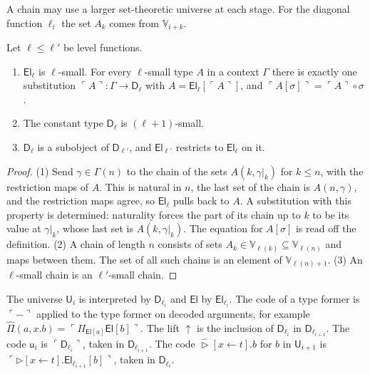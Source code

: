 \documentclass[acmsmall,nonacm,screen]{acmart}
\newcommand{\later}{{\triangleright}}
\newcommand{\laterc}{\widehat{\triangleright}}
\newcommand{\Uv}{\mathsf{U}}
\newcommand{\El}{\mathsf{El}}
\newcommand{\Vg}{\mathbb{V}}
\newcommand{\Dg}{\mathsf{D}}
\newcommand{\dsub}[2]{[#1 \leftarrow #2]}
\newcommand{\rest}[2]{#1|_{#2}}
\begin{document}
A chain may use a larger set-theoretic universe at each stage. For the diagonal function
$\ell_i$ the set $A_k$ comes from $\Vg_{i+k}$.

\begin{lemma}\label{lem:classify}
Let $\ell \le \ell'$ be level functions.
\begin{enumerate}
\item $\El_\ell$ is $\ell$-small. For every $\ell$-small type $A$ in a context $\Gamma$ there
  is exactly one substitution $\ulcorner A \urcorner : \Gamma \to \Dg_\ell$ with
  $A = \El_\ell[\ulcorner A \urcorner]$, and
  $\ulcorner A[\sigma] \urcorner = \ulcorner A \urcorner \circ \sigma$.
\item The constant type $\Dg_\ell$ is $(\ell+1)$-small.
\item $\Dg_\ell$ is a subobject of $\Dg_{\ell'}$, and $\El_{\ell'}$ restricts to $\El_\ell$ on
  it.
\end{enumerate}
\end{lemma}

\begin{proof}
(1) Send $\gamma \in \Gamma(n)$ to the chain of the sets $A(k,\rest{\gamma}{k})$ for
$k \le n$, with the restriction maps of $A$. This is natural in $n$, the last set of the
chain is $A(n,\gamma)$, and the restriction maps agree, so $\El_\ell$ pulls back to $A$. A
substitution with this property is determined: naturality forces the part of its chain up
to $k$ to be its value at $\rest{\gamma}{k}$, whose last set is $A(k,\rest{\gamma}{k})$.
The equation for $A[\sigma]$ is read off the definition. (2) A chain of length $n$ consists
of sets $A_k \in \Vg_{\ell(k)} \subseteq \Vg_{\ell(n)}$ and maps between them. The set of all
such chains is an element of $\Vg_{\ell(n)+1}$. (3) An $\ell$-small chain is an
$\ell'$-small chain.
\end{proof}

\begin{definition}[Interpretation]\label{def:interp}
The universe $\Uv_i$ is interpreted by $\Dg_{\ell_i}$ and $\El$ by $\El_{\ell_i}$. The code of
a type former is $\ulcorner - \urcorner$ applied to the type former on decoded arguments,
for example $\widehat{\Pi}(a,x.b) = \ulcorner \Pi_{\El[a]}\El[b] \urcorner$. The lift
${\uparrow}$ is the inclusion of $\Dg_{\ell_i}$ in $\Dg_{\ell_{i+1}}$. The code
$\mathsf{u}_i$ is $\ulcorner \Dg_{\ell_i} \urcorner$, taken in $\Dg_{\ell_{i+1}}$. The code
$\laterc\dsub{x}{t}.b$ for $b$ in $\Uv_{i+1}$ is
$\ulcorner \later\dsub{x}{t}.\El_{\ell_{i+1}}[b] \urcorner$, taken in $\Dg_{\ell_i}$.
\end{definition}
\end{document}
